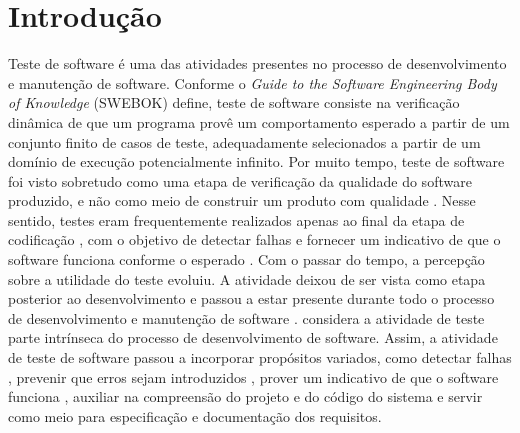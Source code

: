\chapter{Introdução}

Teste de software é uma das atividades presentes no processo de desenvolvimento e manutenção de software. Conforme o \textit{Guide to the Software Engineering Body of Knowledge} (SWEBOK) \cite{bourque:etal:2014} define, teste de software consiste na verificação dinâmica de que um programa provê um comportamento esperado a partir de um conjunto finito de casos de teste, adequadamente selecionados a partir de um domínio de execução potencialmente infinito. Por muito tempo, teste de software foi visto sobretudo como uma etapa de verificação da qualidade do software produzido, e não como meio de construir um produto com qualidade \cite{murugesan:1994}. Nesse sentido, testes eram frequentemente realizados apenas ao final da etapa de codificação \cite{yang:etal:2011}, com o objetivo de detectar falhas e fornecer um indicativo de que o software funciona conforme o esperado \cite{bertolino:2007}. Com o passar do tempo, a percepção sobre a utilidade do teste evoluiu. A atividade deixou de ser vista como etapa posterior ao desenvolvimento e passou a estar presente durante todo o processo de desenvolvimento e manutenção de software \cite{bourque:etal:2014}.  considera a atividade de teste parte intrínseca do processo de desenvolvimento de software. Assim, a atividade de teste de software passou a incorporar propósitos variados, como detectar falhas \cite{tiwari:etal:2013}, prevenir que erros sejam introduzidos \cite{beizer:1990}, prover um indicativo de que o software funciona \cite{bertolino:2007}, auxiliar na compreensão do projeto e do código do sistema \cite{freeman:etal:2009} e servir como meio para especificação \cite{alvestad:2007} e documentação \cite{haugset:2008} dos requisitos.

